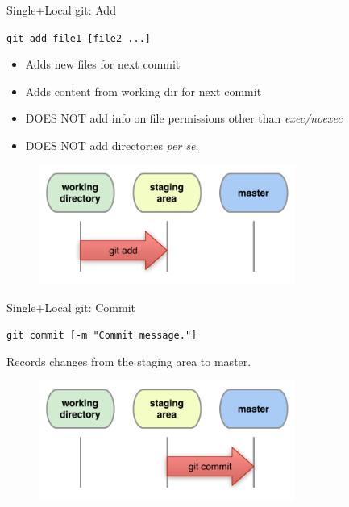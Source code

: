 \documentclass{beamer}
\newcommand{\git}{git\xspace}
\begin{document}
\begin{frame}{Single+Local \git: Add}
  \begin{center}
    \texttt{git add file1 [file2 ...]}
  \end{center}
  \begin{itemize}
  \item Adds new files for next commit
  \item Adds content from working dir for next commit
  \item DOES NOT add info on file permissions other than \emph{exec/noexec}
  \item DOES NOT add directories \emph{per se}.
  \end{itemize}
  \begin{figure}
    \centering
    \includegraphics[width=0.75\textwidth]{figs/local-add}
  \end{figure}
\end{frame}


\begin{frame}{Single+Local \git: Commit}
  \begin{center}
    \texttt{git commit [-m "Commit message."]}
  \end{center}
  Records changes from the staging area to master.
  \begin{figure}
    \centering
    \includegraphics[width=0.75\textwidth]{figs/local-commit}
  \end{figure}
\end{frame}
\end{document}
